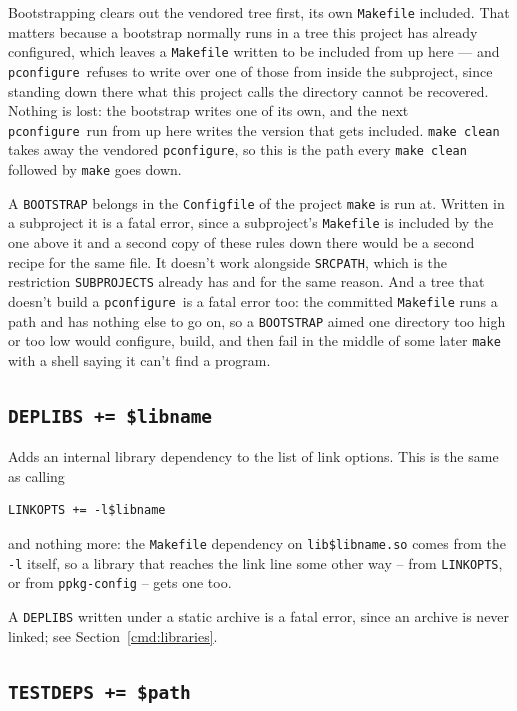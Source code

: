 \documentclass{article}
\newcommand{\pconfigure}{\texttt{pconfigure}}
\begin{document}
Bootstrapping clears out the vendored tree first, its own
\texttt{Makefile} included.  That matters because a bootstrap
normally runs in a tree this project has already configured, which
leaves a \texttt{Makefile} written to be included from up here ---
and \pconfigure\ refuses to write over one of those from inside the
subproject, since standing down there what this project calls the
directory cannot be recovered.  Nothing is lost: the bootstrap writes
one of its own, and the next \pconfigure\ run from up here writes
the version that gets included.  \texttt{make clean} takes away the
vendored \pconfigure, so this is the path every \texttt{make clean}
followed by \texttt{make} goes down.

A \texttt{BOOTSTRAP} belongs in the \texttt{Configfile} of the project
\texttt{make} is run at.  Written in a subproject it is a fatal error,
since a subproject's \texttt{Makefile} is included by the one above it
and a second copy of these rules down there would be a second recipe
for the same file.  It doesn't work alongside \texttt{SRCPATH}, which
is the restriction \texttt{SUBPROJECTS} already has and for the same
reason.  And a tree that doesn't build a \pconfigure\ is a fatal error
too: the committed \texttt{Makefile} runs a path and has nothing else
to go on, so a \texttt{BOOTSTRAP} aimed one directory too high or too
low would configure, build, and then fail in the middle of some later
\texttt{make} with a shell saying it can't find a program.

\subsection{\texttt{DEPLIBS += \$libname} \label{cmd:deplibs}}

Adds an internal library dependency to the list of link options.  This
is the same as calling
\begin{verbatim}
LINKOPTS += -l$libname
\end{verbatim}
and nothing more: the \texttt{Makefile} dependency on
\texttt{lib\$libname.so} comes from the \texttt{-l} itself, so a
library that reaches the link line some other way -- from
\texttt{LINKOPTS}, or from \texttt{ppkg-config} -- gets one too.

A \texttt{DEPLIBS} written under a static archive is a fatal error,
since an archive is never linked; see Section~\ref{cmd:libraries}.

\subsection{\texttt{TESTDEPS += \$path} \label{cmd:testdeps}}
\end{document}
